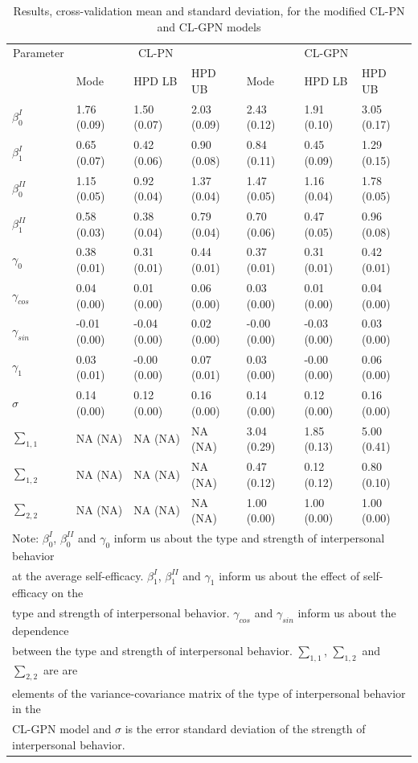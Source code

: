 \documentclass[man]{apa6}
\theoremstyle{definition}
\theoremstyle{definition}
\theoremstyle{definition}
\theoremstyle{remark}
\begin{document}
\begin{table}

\caption{\label{tab:estCLGPN}Results, cross-validation mean and standard deviation, for the modified CL-PN and CL-GPN models}
\centering
\begin{tabular}[t]{lllllll}
\toprule
\multicolumn{1}{c}{Parameter} & \multicolumn{3}{c}{CL-PN} & \multicolumn{3}{c}{CL-GPN} \\
\cmidrule(l{2pt}r{2pt}){1-1} \cmidrule(l{2pt}r{2pt}){2-4} \cmidrule(l{2pt}r{2pt}){5-7}
  & Mode & HPD LB & HPD UB & Mode & HPD LB & HPD UB\\
\midrule
$\beta_0^{I}$ & 1.76 (0.09) & 1.50 (0.07) & 2.03 (0.09) & 2.43 (0.12) & 1.91 (0.10) & 3.05 (0.17)\\
$\beta_1^{I}$ & 0.65 (0.07) & 0.42 (0.06) & 0.90 (0.08) & 0.84 (0.11) & 0.45 (0.09) & 1.29 (0.15)\\
$\beta_0^{II}$ & 1.15 (0.05) & 0.92 (0.04) & 1.37 (0.04) & 1.47 (0.05) & 1.16 (0.04) & 1.78 (0.05)\\
$\beta_1^{II}$ & 0.58 (0.03) & 0.38 (0.04) & 0.79 (0.04) & 0.70 (0.06) & 0.47 (0.05) & 0.96 (0.08)\\
$\gamma_0$ & 0.38 (0.01) & 0.31 (0.01) & 0.44 (0.01) & 0.37 (0.01) & 0.31 (0.01) & 0.42 (0.01)\\
\addlinespace
$\gamma_{cos}$ & 0.04 (0.00) & 0.01 (0.00) & 0.06 (0.00) & 0.03 (0.00) & 0.01 (0.00) & 0.04 (0.00)\\
$\gamma_{sin}$ & -0.01 (0.00) & -0.04 (0.00) & 0.02 (0.00) & -0.00 (0.00) & -0.03 (0.00) & 0.03 (0.00)\\
$\gamma_1$ & 0.03 (0.01) & -0.00 (0.00) & 0.07 (0.01) & 0.03 (0.00) & -0.00 (0.00) & 0.06 (0.00)\\
$\sigma$ & 0.14 (0.00) & 0.12 (0.00) & 0.16 (0.00) & 0.14 (0.00) & 0.12 (0.00) & 0.16 (0.00)\\
$\sum_{1,1}$ & NA (NA) & NA (NA) & NA (NA) & 3.04 (0.29) & 1.85 (0.13) & 5.00 (0.41)\\
\addlinespace
$\sum_{1,2}$ & NA (NA) & NA (NA) & NA (NA) & 0.47 (0.12) & 0.12 (0.12) & 0.80 (0.10)\\
$\sum_{2,2}$ & NA (NA) & NA (NA) & NA (NA) & 1.00 (0.00) & 1.00 (0.00) & 1.00 (0.00)\\
\bottomrule
\multicolumn{7}{l}{Note: $\beta_0^{I}$, $\beta_0^{II}$ and $\gamma_0$ inform us about the type and strength of interpersonal behavior}\\
\multicolumn{7}{l}{at the average self-efficacy. $\beta_1^{I}$, $\beta_1^{II}$ and $\gamma_1$ inform us about the effect of self-efficacy on the}\\
\multicolumn{7}{l}{type and strength of interpersonal behavior. $\gamma_{cos}$ and $\gamma_{sin}$ inform us about the dependence}\\
\multicolumn{7}{l}{ between the type and strength of interpersonal behavior. $\sum_{1,1}$, $\sum_{1,2}$ and $\sum_{2,2}$ are are}\\
\multicolumn{7}{l}{elements of the variance-covariance matrix of the type of interpersonal behavior in the}\\
\multicolumn{7}{l}{CL-GPN model and $\sigma$ is the error standard deviation of the strength of interpersonal behavior.}\\


\end{tabular}
\end{table}
\end{document}
